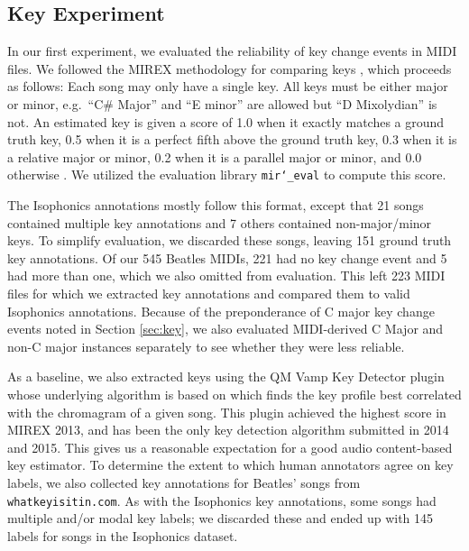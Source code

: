 \subsection{Key Experiment}

In our first experiment, we evaluated the reliability of key change events in MIDI files.
We followed the MIREX methodology for comparing keys \cite{ehmann2016mirex}, which proceeds as follows:
Each song may only have a single key.
All keys must be either major or minor, e.g.\ ``C\# Major'' and ``E minor'' are allowed but ``D Mixolydian'' is not.
An estimated key is given a score of 1.0 when it exactly matches a ground truth key, 0.5 when it is a perfect fifth above the ground truth key, 0.3 when it is a relative major or minor, 0.2 when it is a parallel major or minor, and 0.0 otherwise \cite{ehmann2016mirex}.
We utilized the evaluation library \texttt{mir\char`_eval} \cite{raffel2014mir_eval} to compute this score.

The Isophonics annotations mostly follow this format, except that 21 songs contained multiple key annotations and 7 others contained non-major/minor keys.
To simplify evaluation, we discarded these songs, leaving 151 ground truth key annotations.
Of our 545 Beatles MIDIs, 221 had no key change event and 5 had more than one, which we also omitted from evaluation.
This left 223 MIDI files for which we extracted key annotations and compared them to valid Isophonics annotations.
Because of the preponderance of C major key change events noted in Section \ref{sec:key}, we also evaluated MIDI-derived C Major and non-C major instances separately to see whether they were less reliable.

As a baseline, we also extracted keys using the QM Vamp Key Detector plugin \cite{cannam2015mirex} whose underlying algorithm is based on \cite{noland2007signal} which finds the key profile best correlated with the chromagram of a given song.
This plugin achieved the highest score in MIREX 2013, and has been the only key detection algorithm submitted in 2014 and 2015.
This gives us a reasonable expectation for a good audio content-based key estimator.
To determine the extent to which human annotators agree on key labels, we also collected key annotations for Beatles' songs from \texttt{whatkeyisitin.com}.
As with the Isophonics key annotations, some songs had multiple and/or modal key labels; we discarded these and ended up with 145 labels for songs in the Isophonics dataset.

